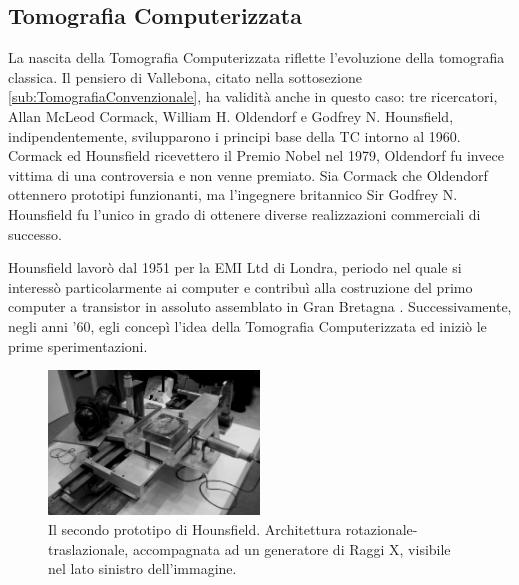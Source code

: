 \documentclass[a4paper,12pt, doubleside]{report}
\begin{document}
            \subsection{Tomografia Computerizzata}
                \par      
                    La nascita della Tomografia Computerizzata riflette l'evoluzione della tomografia classica. Il pensiero di Vallebona, citato nella sottosezione \ref{sub:TomografiaConvenzionale}, ha validità anche in questo caso: tre ricercatori, Allan McLeod Cormack, William H. Oldendorf e Godfrey N. Hounsfield, indipendentemente, svilupparono i principi base della TC intorno al 1960. Cormack ed Hounsfield ricevettero il Premio Nobel nel 1979, Oldendorf fu invece vittima di una controversia \cite{nobel-debate} e non venne premiato. 
                    Sia Cormack che Oldendorf ottennero prototipi funzionanti, ma l'ingegnere britannico Sir Godfrey N. Hounsfield fu l'unico in grado di ottenere diverse realizzazioni commerciali di successo.
                
                \bigskip
                \par
                    Hounsfield lavorò dal 1951 per la EMI Ltd di Londra, periodo nel quale si interessò particolarmente ai computer e contribuì alla costruzione del primo computer a transistor in assoluto assemblato in Gran Bretagna \cite{hounsfield-autobiografia}. Successivamente, negli anni '60, egli concepì l’idea della Tomografia Computerizzata ed iniziò le prime sperimentazioni.
                            
                    \begin{figure}[h]
                        \centering
                        \includegraphics[width=0.5\textwidth]{hounsfield_prototype2}
                        \caption{Il secondo prototipo di Hounsfield. Architettura rotazionale-traslazionale, accompagnata ad un generatore di Raggi X, visibile nel lato sinistro dell'immagine.}
                        \label{fig:second-prototype}
                    \end{figure}
                            
\end{document}
